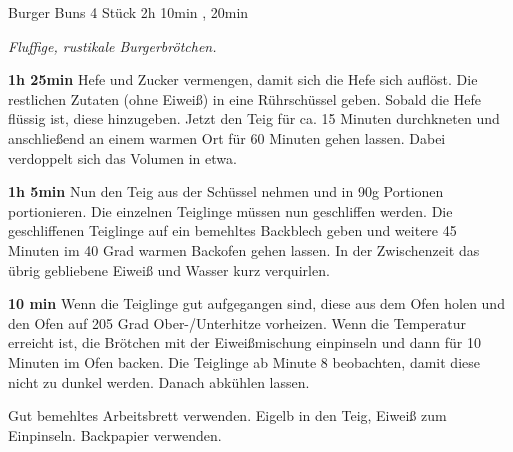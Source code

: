 \documentclass[../recipe-collections/cooking.tex]{subfiles}
\begin{document}
\begin{recipe}{Burger Buns} {4 Stück } {2h 10min , 20min }

  \freeform{}\textit{Fluffige, rustikale Burgerbrötchen.}


  \textbf{1h 25min}
  Hefe und Zucker vermengen, damit sich die Hefe sich auflöst.
  Die restlichen Zutaten (ohne Eiweiß) in eine Rührschüssel geben.
  Sobald die Hefe flüssig ist, diese hinzugeben.
  Jetzt den Teig für ca. 15 Minuten durchkneten und anschließend an einem warmen Ort für 60 Minuten gehen lassen.
  Dabei verdoppelt sich das Volumen in etwa.

  \newstep{}\textbf{1h 5min}
  Nun den Teig aus der Schüssel nehmen und in 90g Portionen portionieren.
  Die einzelnen Teiglinge müssen nun geschliffen werden.
  Die geschliffenen Teiglinge auf ein bemehltes Backblech geben und weitere 45 Minuten im 40 Grad warmen Backofen gehen lassen.
  In der Zwischenzeit das übrig gebliebene Eiweiß und Wasser kurz verquirlen.

  \newstep{}\textbf{10 min}
  Wenn die Teiglinge gut aufgegangen sind, diese aus dem Ofen holen und den Ofen auf 205 Grad Ober-/Unterhitze vorheizen.
  Wenn die Temperatur erreicht ist, die Brötchen mit der Eiweißmischung einpinseln und dann für 10 Minuten im Ofen backen.
  Die Teiglinge ab Minute 8 beobachten, damit diese nicht zu dunkel werden.
  Danach abkühlen lassen.

  \freeform{}\hrulefill{}

  \freeform{}
  Gut bemehltes Arbeitsbrett verwenden.
  Eigelb in den Teig, Eiweiß zum Einpinseln.
  Backpapier verwenden.

\end{recipe}
\end{document}
